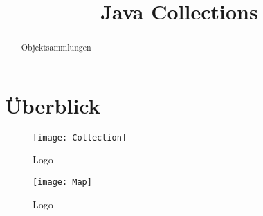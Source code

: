 \documentclass{infoblatt-sth}
\title{Java Collections}
\begin{document}
	\setlength{\droptitle}{-40pt} %
	\maketitle
	
	
	
	
	
	
	\setcounter{page}{1}
	



\begin{abstract}
 Objektsammlungen
\end{abstract}
\section{Überblick}

\begin{figure}[htbp] 
	\centering
	\texttt{[image: Collection]}
	\caption{Logo}
	\label{fig:Das Collections-Framework}
\end{figure}

\begin{figure}[htbp] 
	\centering
	\texttt{[image: Map]}
	\caption{Logo}
	\label{fig:Maps}
\end{figure}
\end{document}
